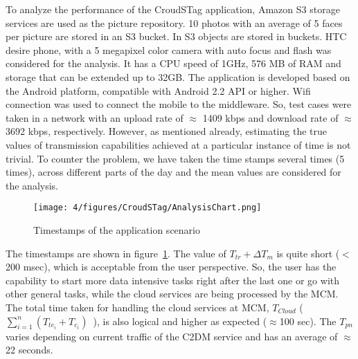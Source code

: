 To analyze the performance of the CroudSTag application, Amazon S3 storage services are used as the picture repository. 10 photos with an average of 5 faces per picture are stored in an S3 bucket. In S3 objects are stored in buckets. HTC desire phone, with a 5 megapixel color camera with auto focus and flash was considered for the analysis. It has a CPU speed of 1GHz, 576 MB of RAM and storage that can be extended up to 32GB. The application is developed based on the Android platform, compatible with Android 2.2 API or higher. Wifi connection was used to connect the mobile to the middleware. So, test cases were taken in a network with an upload rate of $\approx$ 1409 kbps and download rate of $\approx$ 3692 kbps, respectively. However, as mentioned already, estimating the true values of transmission capabilities achieved at a particular instance of time is not trivial. To counter the problem, we have taken the time stamps several times (5 times), across different parts of the day and the mean values are considered for the analysis.

\begin{figure}
\centering
\texttt{[image: 4/figures/CroudSTag/AnalysisChart.png]}
\caption{Timestamps of the application scenario}
\label{fig:AnalysisChartCroudSTag}
\end{figure}

The timestamps are shown in figure~\ref{fig:AnalysisChartCroudSTag}. The value of $T_{tr} + \Delta T_m$ is quite short ($<$ 200 msec), which is acceptable from the user perspective. So, the user has the capability to start more data intensive tasks right after the last one or go with other general tasks, while the cloud services are being processed by the MCM. The total time taken for handling the cloud services at MCM, $T_{Cloud}$ (~$\sum_{i=1}^n (T_{{te}_i} + T_{c_i})$~), is also logical and higher as expected ($\approx$100 sec). The $T_{pn}$ varies depending on current traffic of the C2DM service and has an average of $\approx$22 seconds.





